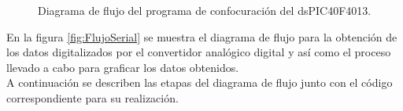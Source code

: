 	\begin{figure}[htbp!]
		\centering
		\caption{Diagrama de flujo del programa de confocuración del dsPIC40F4013.}
		\label{fig:ConfiguracionMicro}
	\end{figure}
\pagebreak
En la figura \ref{fig:FlujoSerial} se muestra el diagrama de flujo para la obtención de los datos digitalizados por el convertidor analógico digital y así como el proceso llevado a cabo para graficar los datos obtenidos.\\

A continuación se describen las etapas del diagrama de flujo junto con el código correspondiente para su realización.

